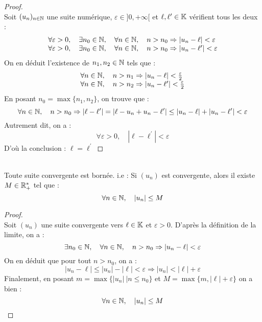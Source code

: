     \begin{proof}
        \ \\
        Soit \((u_n)_{n\in\mathbb{N}}\) une suite numérique, \(\varepsilon \in ]0, +\infty[ \) et \(\ell, \ell^{\prime} \in \mathbb{K}\) vérifient tous les deux :
        \[
            \begin{array}{l}
                \forall \varepsilon > 0, \quad \exists n_0 \in \mathbb{N}, \quad \forall n \in \mathbb{N}, \quad n > n_0 \Rightarrow |u_n - \ell| < \varepsilon\\
                \forall \varepsilon > 0, \quad \exists n_0 \in \mathbb{N}, \quad \forall n \in \mathbb{N}, \quad n > n_0 \Rightarrow |u_n - \ell^{\prime}| < \varepsilon\\
            \end{array}
        \]
        On en déduit l'existence de \(n_1, n_2 \in \mathbb{N}\) tels que :
        \[
            \begin{array}{l}
                \forall n \in \mathbb{N},\quad n > n_1 \Rightarrow |u_n - \ell| < \frac{\varepsilon}{2}\\
                \forall n \in \mathbb{N},\quad n > n_2 \Rightarrow |u_n - \ell^{\prime}| < \frac{\varepsilon}{2}\\
            \end{array}    
        \]
        En posant \(n_0 = \max{\{n_1, n_2\}}\), on trouve que :
        \[
            \forall n \in \mathbb{N},\quad n > n_0 \Rightarrow |\ell - \ell^{\prime}| = |\ell - u_n + u_n - \ell^{\prime}| \le |u_n - \ell| + |u_n - \ell^{\prime}| < \varepsilon
        \]
        Autrement dit, on a :
        \[
            \forall \varepsilon > 0, \quad |\ell - \ell^{\prime}| < \varepsilon 
        \]
        D'où la conclusion : \(\ell =  \ell^{\prime}\)
    \end{proof}

    \begin{theorem}
        \ \\
        Toute suite convergente est bornée. i.e : Si \((u_n)\) est convergente, alors il existe \(M \in \mathbb{R}^{*}_{+}\) tel que :
        \[\forall n \in \mathbb{N}, \quad |u_n| \le M\]
    \end{theorem}

    \begin{proof}
        \ \\
        Soit \((u_n)\) une suite convergente vers \(\ell \in  \mathbb{K}\) et \(\varepsilon > 0\). D'après la définition de la limite, on a :
        \[
            \exists n_0 \in \mathbb{N}, \quad \forall n \in \mathbb{N}, \quad n > n_0 \Rightarrow |u_n - \ell| < \varepsilon    
        \]
        On en déduit que pour tout \(n>n_0\), on a :
        \[
            |u_n - \ell| \le |u_n| - |\ell| < \varepsilon \Rightarrow |u_n| < |\ell| +\varepsilon     
        \]
        Finalement, en posant \(m = \max{\{|u_n|\ | n \le n_0\}}\) et \(M = \max{\{m, |\ell| + \varepsilon\}}\) on a bien :
        \[\forall n \in \mathbb{N}, \quad |u_n| \le M\]
    \end{proof}


